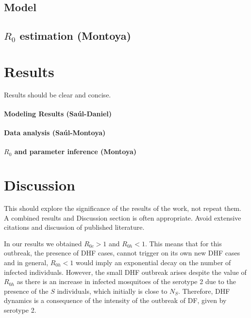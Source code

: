 \documentclass[5p, authoryear, final, sort&compress, times]{elsarticle}
\begin{document}
		\subsection*{Model}
			
			
			
		\subsection{$R_0$ estimation (Montoya)}
	\section{Results}
		Results should be clear and concise.
		\paragraph{Modeling Results (Saúl-Daniel)}
\paragraph{Data analysis (Saúl-Montoya)}
		\paragraph{$R_0$ and parameter inference (Montoya)}

	\section{Discussion}
		This should explore the significance of the results of 
    the work, not repeat them. A combined results and 
    Discussion section is often appropriate. Avoid extensive 
    citations and discussion of published literature.

    In our results we obtained $R_{0c}>1$ and  $R_{0h}<1$. This means that for this outbreak, the presence of DHF cases, cannot trigger on its own new DHF cases and in general, $R_{0h}<1$ would imply an exponential decay on the number of infected individuals. However, the small DHF outbreak arises despite the value of $R_{0h}$ as there is an increase in infected mosquitoes of the serotype 2 due to the presence of the $S$ individuals, which initially is close to $N_S$. Therefore, DHF dynamics is a consequence of the intensity of the outbreak of DF, given by serotype 2. 
    
    
    
\end{document}
